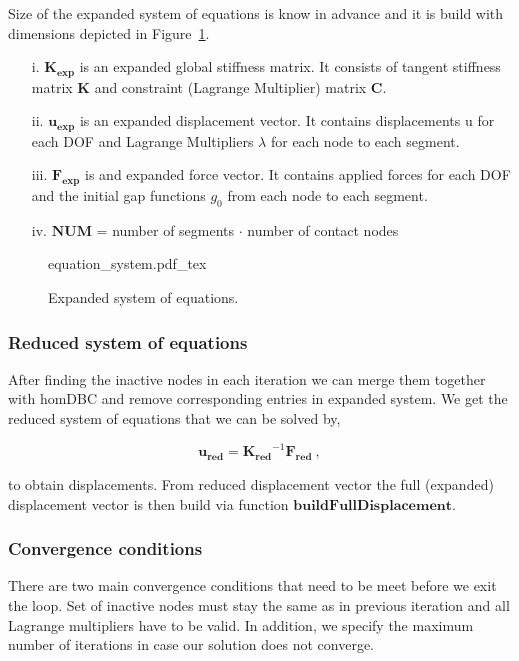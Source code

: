 \documentclass[10pt,a4paper]{article}
\begin{document}
Size of the expanded system of equations is know in advance and it is build with dimensions depicted in Figure~\ref{im:expanded_system}.

\begin{itemize}

	\item[i.] $\mathbf{K_{exp}}$ is an expanded global stiffness matrix. It consists of tangent stiffness matrix $\mathbf{K}$ and constraint (Lagrange Multiplier) matrix $\mathbf{C}$.
	
	\item[ii.] $\mathbf{u_{exp}}$ is an expanded displacement vector. It contains displacements u for each DOF and Lagrange Multipliers $\lambda$ for each node to each segment.
	
	\item[iii.] $\mathbf{F_{exp}}$ is and expanded force vector. It contains applied forces for each DOF and the initial gap functions $g_0$ from each node to each segment.
	
	\item[iv.] $\mathbf{NUM}$ = number of segments $\mathbf{\cdot}$ number of contact nodes

\end{itemize}

\begin{figure}[ht]
	\centering
	\footnotesize
    \def\svgwidth{0.8\textwidth}{equation_system.pdf_tex}
	\caption{Expanded system of equations.}
	\label{im:expanded_system}
\end{figure}

\subsubsection{Reduced system of equations}

After finding the inactive nodes in each iteration we can merge them together with homDBC and remove corresponding entries in expanded system. We get the reduced system of equations that we can be solved by, 

\begin{equation}
	\mathbf{u_{red}} = \mathbf{K_{red}}^{-1}  \mathbf{F_{red}} \:,
	\label{eq:positive_gap}
\end{equation}

to obtain displacements. From reduced displacement vector the full (expanded) displacement vector is then build via function $\textbf{buildFullDisplacement}$.

\subsubsection{Convergence conditions}

There are two main convergence conditions that need to be meet before we exit the loop. Set of inactive nodes must stay the same as in previous iteration and all Lagrange multipliers have to be valid. In addition, we specify the maximum number of iterations in case our solution does not converge.

% 


\nocite{*}
\end{document}

